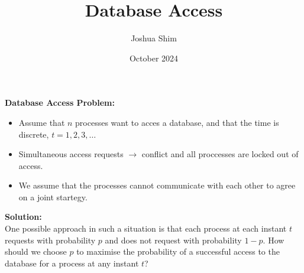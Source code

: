 \documentclass[12pt, letterpaper]{article}
\title{Database Access}
\author{Joshua Shim}
\date{October 2024}
\begin{document}
\maketitle
\newpage
\textbf{Database Access Problem:}\\
\begin{itemize}
    \item Assume that $n$ processes want to acces a database, and that the time is discrete, $t = 1, 2, 3,\dots$
    \item Simultaneous access requests $\rightarrow$ conflict and all proccesses are locked out of access.
    \item We assume that the processes cannot communicate with each other to agree on a joint startegy.
\end{itemize}
\textbf{Solution:}\\
One possible approach in such a situation is that each process at each instant $t$ requests with probability $p$ and does not request with probability $1 - p$. How should we choose $p$ to maximise the probability of a successful access to the database for a process at any instant $t$?
\end{document}
